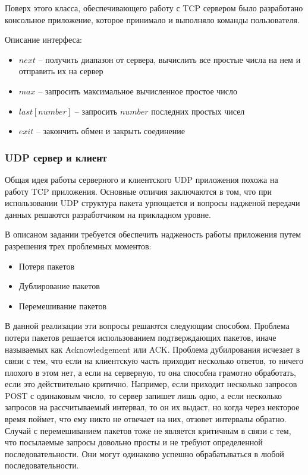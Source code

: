 \documentclass[a4paper,14pt]{extarticle}
\begin{document}
Поверх этого класса, обеспечивающего работу с TCP сервером было разработано консольное приложение, которое принимало и выполняло команды пользователя.

Описание интерфеса:
\begin{itemize}
\item $next$ -- получить диапазон от сервера, вычислить все простые числа на нем и отправить их на сервер
\item $max$ -- запросить максимальное вычисленное простое число
\item $last [number]$ -- запросить $number$ последних простых чисел
\item $exit$ -- закончить обмен и закрыть соединение
\end{itemize}

\subsubsection{UDP сервер и клиент}
Общая идея работы серверного и клиентского UDP приложения  похожа на работу TCP приложения. Основные отличия заключаются в том, что при использовании UDP структура пакета урпощается и вопросы надженой передачи данных решаются разработчиком на прикладном уровне.

В описаном задании требуется обеспечить надженость работы приложения путем разрешения трех проблемных моментов:
\begin{itemize}
\item Потеря пакетов
\item Дублирование пакетов
\item Перемешивание пакетов
\end{itemize}

В данной реализации эти вопросы решаются следующим способом. Проблема потери пакетов решается использованием подтверждающих пакетов, иначе называемых как Acknowledgement или ACK. Проблема дубилрования исчезает в связи с тем, что если на клиентскую часть приходит несколько ответов, то ничего плохого в этом нет, а если на серверную, то она способна грамотно обработать, если это действительно критично. Например, если приходит несколько запросов POST с одинаковым число, то сервер запишет лишь одно, а если несколько запросов на рассчитываемый интервал, то он их выдаст, но когда через некторое время поймет, что ему никто не отвечает на них, отзовет интервалы обратно. Случай с перемешиванием пакетов тоже не является критичным в связи с тем, что посылаемые запросы довольно просты и не требуют определенной последовательности. Они могут одинаково успешно обрабатываться в любой последовательности.
\end{document}

